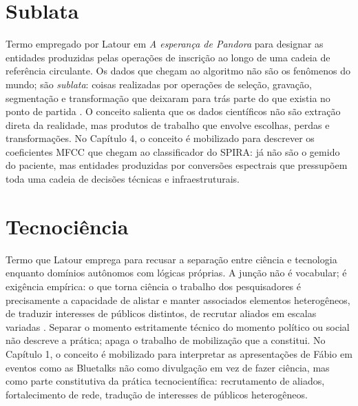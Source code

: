 \begin{description}
\bigskip

\section*{Sublata}

Termo empregado por Latour em \textit{A esperança de Pandora} para designar as entidades produzidas pelas operações de inscrição ao longo de uma cadeia de referência circulante. Os dados que chegam ao algoritmo não são os fenômenos do mundo; são \textit{sublata}: coisas realizadas por operações de seleção, gravação, segmentação e transformação que deixaram para trás parte do que existia no ponto de partida \parencite[p.~42]{Latour2017Esperanca}. O conceito salienta que os dados científicos não são extração direta da realidade, mas produtos de trabalho que envolve escolhas, perdas e transformações. No Capítulo 4, o conceito é mobilizado para descrever os coeficientes MFCC que chegam ao classificador do SPIRA: já não são o gemido do paciente, mas entidades produzidas por conversões espectrais que pressupõem toda uma cadeia de decisões técnicas e infraestruturais.

\bigskip

\section*{Tecnociência}

Termo que Latour emprega para recusar a separação entre ciência e tecnologia enquanto domínios autônomos com lógicas próprias. A junção não é vocabular; é exigência empírica: o que torna ciência o trabalho dos pesquisadores é precisamente a capacidade de alistar e manter associados elementos heterogêneos, de traduzir interesses de públicos distintos, de recrutar aliados em escalas variadas \parencite{Latour2011CienciaEmAcao}. Separar o momento estritamente técnico do momento político ou social não descreve a prática; apaga o trabalho de mobilização que a constitui. No Capítulo 1, o conceito é mobilizado para interpretar as apresentações de Fábio em eventos como as Bluetalks não como divulgação em vez de fazer ciência, mas como parte constitutiva da prática tecnocientífica: recrutamento de aliados, fortalecimento de rede, tradução de interesses de públicos heterogêneos.


\end{description}
